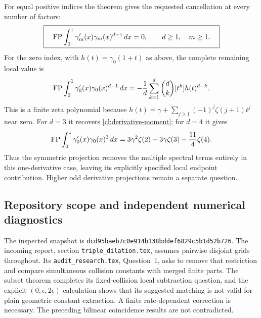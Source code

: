 For equal positive indices the theorem gives the requested cancellation
at every number of factors:
\begin{equation}\label{cl:equal-index-cancellation}
 \boxed{\quad
 \operatorname{FP}\int_0^1\gamma_m'(x)\gamma_m(x)^{d-1}\,dx=0,
       \qquad d\ge1,\quad m\ge1.
 \quad}
\end{equation}
For the zero index, with $h(t)=\gamma_0(1+t)$ as above, the complete
remaining local value is
\begin{equation}\label{cl:zero-index-projection}
 \operatorname{FP}\int_0^1\gamma_0'(x)\gamma_0(x)^{d-1}\,dx
 =-\frac1d\sum_{k=1}^d\binom dk[t^k]h(t)^{d-k}.
\end{equation}
This is a finite zeta polynomial because
$h(t)=\gamma+\sum_{j\ge1}(-1)^j\zeta(j+1)t^j$ near zero.
For $d=3$ it recovers \eqref{cl:derivative-moment}; for $d=4$ it gives
\[
 \operatorname{FP}\int_0^1\gamma_0'(x)\gamma_0(x)^3\,dx
 =3\gamma^2\zeta(2)-3\gamma\zeta(3)-\frac{11}{4}\zeta(4).
\]
Thus the symmetric projection removes the multiple spectral terms
entirely in this one-derivative case, leaving its explicitly specified
local endpoint contribution. Higher odd derivative projections remain
a separate question.

\subsection{Repository scope and independent numerical diagnostics}
\label{cl:numerics}

The inspected snapshot is
\texttt{dcd95baeb7c0e914b138bddef6829c5b1d52b726}.
The incoming  report, section
\texttt{triple\_dilation.tex}, assumes pairwise disjoint grids throughout.
Its \texttt{audit\_research.tex}, Question~1, asks to remove that
restriction and compare simultaneous collision constants with merged
finite parts. The subset theorem completes its fixed-collision local
subtraction question, and the explicit $(0,\epsilon,2\epsilon)$
calculation shows that its suggested matching is not valid for plain
geometric constant extraction. A finite rate-dependent correction
is necessary. The preceding bilinear coincidence results are not
contradicted.


